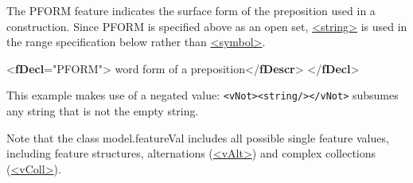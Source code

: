 The PFORM feature indicates the surface form of the preposition used in a construction. Since PFORM is specified above as an open set, \hyperref[TEI.string]{<string>} is used in the range specification below rather than \hyperref[TEI.symbol]{<symbol>}. \par\bgroup{}\exampleFont \begin{shaded}\noindent\mbox{}{<\textbf{fDecl}\hspace*{1em}{name}="{PFORM}">}\mbox{}\newline 
{}word form of a preposition{</\textbf{fDescr}>}\mbox{}\newline 
{}\mbox{}\newline 
\hspace*{1em}\mbox{}\newline 
\hspace*{1em}\hspace*{1em}\mbox{}\newline 
\hspace*{1em}\mbox{}\newline 
{}\mbox{}\newline 
{</\textbf{fDecl}>}\end{shaded}\egroup\par \noindent  This example makes use of a negated value: \texttt{<vNot><string/></vNot>} subsumes any string that is not the empty string.\par
Note that the class \textsf{model.featureVal} includes all possible single feature values, including feature structures, alternations (\hyperref[TEI.vAlt]{<vAlt>}) and complex collections (\hyperref[TEI.vColl]{<vColl>}).
